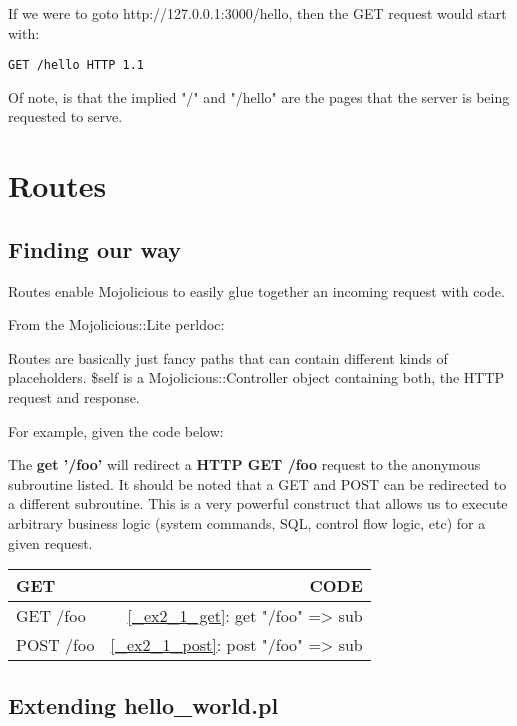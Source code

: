 \documentclass[16pt,pdftex]{book}
\begin{document}
If we were to goto http://127.0.0.1:3000/hello, then the GET request would start with:

\begin{lstlisting}[style=BlockStyle]
    GET /hello HTTP 1.1
\end{lstlisting}

Of note, is that the implied "/" and "/hello" are the pages that the server is being requested to serve.

\section{Routes}

\subsection{Finding our way}

Routes enable Mojolicious to easily glue together an incoming request with
code.

From the Mojolicious::Lite perldoc:

Routes are basically just fancy paths that can contain different kinds of
placeholders. \$self is a Mojolicious::Controller object containing both, the
HTTP request and response.

For example, given the code below:



The \textbf{get '/foo'} will redirect a \textbf{HTTP GET /foo} request to the anonymous
subroutine listed. It should be noted that a GET and POST can be redirected to
a different subroutine.  This is a very powerful construct that allows us to
execute arbitrary business logic (system commands, SQL, control flow logic,
etc) for a given request.

\begin{center}
  \begin{tabular}{|l|r|}
    \hline
    GET  & CODE\\
    \hline
    GET /foo & \ref{_ex2_1_get}: get "/foo" => sub {}\\
    POST /foo & \ref{_ex2_1_post}: post "/foo" => sub {}\\
    \hline
  \end{tabular}
\end{center}

\subsection{Extending hello\_world.pl}
\end{document}
